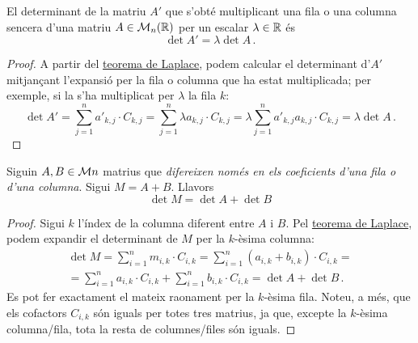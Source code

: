 \begin{prop}
	El determinant de la matriu $A'$ que s'obté multiplicant una fila o una columna sencera d'una matriu $A\in\mathcal{M}_n(\mathbb{R})$ per un escalar $\lambda\in\mathbb{R}$ és \[\det A' = \lambda\det A\,.\]
	\begin{proof}
		A partir del \hyperref[teo:laplace]{teorema de Laplace}, podem calcular el determinant d'$A'$ mitjançant l'expansió per la fila o columna que ha estat multiplicada; per exemple, si la s'ha multiplicat per $\lambda$ la fila $k$:
		\[\det A' = \sum_{j=1}^{n} {a'}_{k,j}\cdot C_{k,j} =\sum_{j=1}^{n} \lambda {a}_{k,j} \cdot C_{k,j} = \lambda \sum_{j=1}^{n} {a'}_{k,j} {a}_{k,j} \cdot C_{k,j} = \lambda\det A\,. \]
	\end{proof}
\end{prop}

\begin{prop}
	Siguin $A,B\in\mathcal{M}{n}$ matrius que \textit{difereixen només en els coeficients d'una fila o d'una columna}. Sigui $M=A+B$. Llavors \[\det M = \det A + \det B \]
	\begin{proof}
		Sigui $k$ l'índex de la columna diferent entre $A$ i $B$. Pel \hyperref[teo:laplace]{teorema de Laplace}, podem expandir el determinant de $M$ per la $k$-èsima columna:
		\begin{multline*}
			\det M = \sum_{i=1}^{n} {m}_{i,k}\cdot C_{i,k} = \sum_{i=1}^{n} ({a}_{i,k}+ {b}_{i,k})\cdot C_{i,k}=\\
			=\sum_{i=1}^{n}{a}_{i,k}\cdot C_{i,k} +\sum_{i=1}^{n} {b}_{i,k}\cdot C_{i,k}=\det A + \det B\,.
		\end{multline*}
		Es pot fer exactament el mateix raonament per la $k$-èsima fila. Noteu, a més, que els cofactors $C_{i,k}$ són iguals per totes tres matrius, ja que, excepte la $k$-èsima columna/fila, tota la resta de columnes/files són iguals.
	\end{proof}
\end{prop}